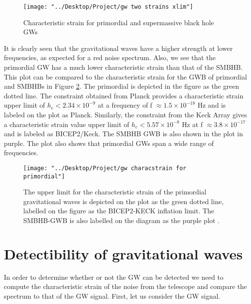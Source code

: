 \documentclass[12pt]{article}
\begin{document}
	\begin{figure}[h!]
		\texttt{[image: "../Desktop/Project/gw two strains xlim"]}
		\caption{Characteristic strain for primordial and supermassive black hole GWs}
		\label{fig:gw-two-strains-xlim}
	\end{figure} It is clearly seen that the gravitational waves have a higher strength at lower frequencies, as expected for a red noise spectrum. Also, we see that the primordial GW has a much lower characteristic strain than that of the SMBHB. This plot can be compared to the characteristic strain for the GWB of primordial and SMBHBs in Figure \ref{fig:gw_spectrum_for_primordial.png}. The primordial is depicted in the figure as the green dotted line. The constraint obtained from Planck provides a characteristic strain upper limit of $h_{c}<2.34 \times 10^{-9}$ at a frequency of f $ \approx 1.5 \times 10^{-18}$ Hz and is labeled on the plot as Planck. Similarly, the constraint from the Keck Array gives a characteristic strain value upper limit of $h_{c}<5.57 \times 10^{-8}$ Hz at f $\approx 3.8 \times 10^{-17}$ and is labeled as BICEP2/Keck. The SMBHB GWB is also shown in the plot in purple. The plot also shows that primordial GWs span a wide range of frequencies. 
   
\begin{figure}[h!]
	\texttt{[image: "../Desktop/Project/gw characstrain for primordial"]}
	\caption{\label{fig:gw_spectrum_for_primordial.png} The upper limit for the characteristic strain of the primordial gravitational waves is depicted on the plot as the green dotted line, labelled on the figure as the BICEP2-KECK inflation limit. The SMBHB-GWB is also labelled on the diagram as the purple plot \cite{kuroda2015gravitational}.}
\end{figure}
		
	\section{Detectibility of gravitational waves} \label{Detectibility of gws}
	In order to determine whether or not the GW can be detected we need to compute the characteristic strain of the noise from the telescope and compare the spectrum to that of the GW signal. First, let us consider the GW signal.\\
	
\end{document}
